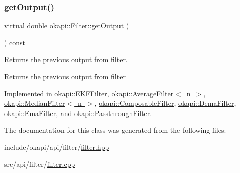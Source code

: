 \subsubsection{\texorpdfstring{getOutput()}{getOutput()}}
{\footnotesize\ttfamily virtual double okapi\+::\+Filter\+::get\+Output (\begin{DoxyParamCaption}{ }\end{DoxyParamCaption}) const\hspace{0.3cm}{\ttfamily [pure virtual]}}

Returns the previous output from filter.

\begin{DoxyReturn}{Returns}
the previous output from filter 
\end{DoxyReturn}


Implemented in \mbox{\hyperlink{classokapi_1_1EKFFilter_aaf3048eb6d68d248de7c59f84b0d1201}{okapi\+::\+E\+K\+F\+Filter}}, \mbox{\hyperlink{classokapi_1_1AverageFilter_a2ee104dfc880e779079dc8e1e242a44b}{okapi\+::\+Average\+Filter$<$ n $>$}}, \mbox{\hyperlink{classokapi_1_1MedianFilter_ac38e6d04879eaeb98b853a24cb26e28c}{okapi\+::\+Median\+Filter$<$ n $>$}}, \mbox{\hyperlink{classokapi_1_1ComposableFilter_a2d54899ce84c463af2f22cfbf36c7c7c}{okapi\+::\+Composable\+Filter}}, \mbox{\hyperlink{classokapi_1_1DemaFilter_a2dba33231bb71e16d13adbcefefed425}{okapi\+::\+Dema\+Filter}}, \mbox{\hyperlink{classokapi_1_1EmaFilter_a883bc02a7244be54f947b6daaa63c0fe}{okapi\+::\+Ema\+Filter}}, and \mbox{\hyperlink{classokapi_1_1PassthroughFilter_a90bd8c34fa22bfc7c6f9f76fd6e655dc}{okapi\+::\+Passthrough\+Filter}}.



The documentation for this class was generated from the following files\+:\begin{DoxyCompactItemize}
\item 
include/okapi/api/filter/\mbox{\hyperlink{filter_8hpp}{filter.\+hpp}}\item 
src/api/filter/\mbox{\hyperlink{filter_8cpp}{filter.\+cpp}}\end{DoxyCompactItemize}
